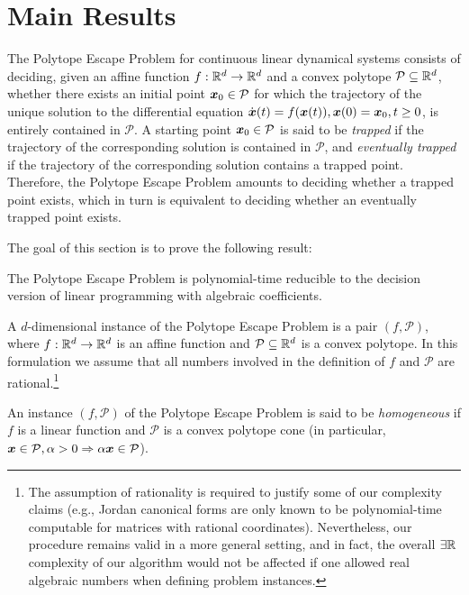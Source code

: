 \section{Main Results}

The Polytope Escape Problem for continuous linear dynamical systems
consists of deciding, given an affine function
$f:\mathbb{R}^{d}\rightarrow \mathbb{R}^{d}$ and a convex polytope
$\mathcal{P}\subseteq\mathbb{R}^{d}$, whether there exists an initial point
$\boldsymbol{x}_{0} \in \mathcal{P}$ for which the trajectory of the unique
solution to the differential equation
$\dot{\boldsymbol{x}}(t)=f(\boldsymbol{x}(t)),\boldsymbol{x}(0)=\boldsymbol{x}_{0},
t\geq 0$,
is entirely contained in $\mathcal{P}$.  A starting point
$\boldsymbol{x}_{0}\in\mathcal{P}$ is said to be \emph{trapped} if
the trajectory of the corresponding solution is contained in $\mathcal{P}$,
and \emph{eventually trapped} if the trajectory of the corresponding
solution contains a trapped point. Therefore, the Polytope Escape
Problem amounts to deciding whether a trapped point exists, which in
turn is equivalent to deciding whether an eventually trapped point exists.

The goal of this section is to prove the following result:

\begin{theorem}
  The Polytope Escape Problem is polynomial-time reducible to the
  decision version of linear programming with algebraic coefficients.
\end{theorem}

A $d$-dimensional instance of the Polytope Escape Problem is a pair
$(f,\mathcal{P})$, where $f:\mathbb{R}^{d}\rightarrow \mathbb{R}^{d}$
is an affine function and $\mathcal{P}\subseteq\mathbb{R}^{d}$ is a
convex polytope. In this formulation we assume that all numbers
involved in the definition of $f$ and $\mathcal{P}$ are
rational.\footnote{The assumption of rationality is required to
  justify some of our complexity claims (e.g., Jordan canonical forms
  are only known to be polynomial-time computable for matrices with
  rational coordinates). Nevertheless, our procedure remains valid in
  a more general setting, and in fact, the overall
  $\exists \mathbb{R}$ complexity of our algorithm would not be
  affected if one allowed real algebraic numbers when defining problem
  instances.}

An instance $(f,\mathcal{P})$ of the Polytope Escape Problem is said
to be \emph{homogeneous} if $f$ is a linear function and
$\mathcal{P}$ is a convex polytope cone (in particular,
$\boldsymbol{x}\in\mathcal{P},\alpha>0\Rightarrow \alpha\boldsymbol{x}
\in\mathcal{P}$).

